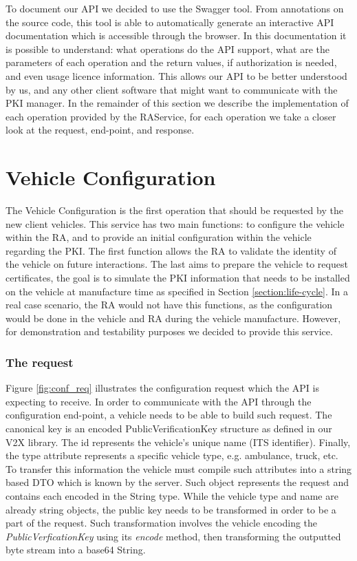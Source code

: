 To document our API we decided to use the Swagger tool. From annotations on the source code, this tool is able to automatically generate an interactive API documentation which is accessible through the browser. In this documentation it is possible to understand: what operations do the API support, what are the parameters of each operation and the return values, if authorization is needed, and even usage licence information. This allows our API to be better understood by us, and any other client software that might want to communicate with the PKI manager. In the remainder of this section we describe the implementation of each operation provided by the RAService, for each operation we take a closer look at the request, end-point, and response.

\section{Vehicle Configuration}
The Vehicle Configuration is the first operation that should be requested by the new client vehicles. This service has two main functions: to configure the vehicle within the RA, and to provide an initial configuration within the vehicle regarding the PKI. The first function allows the RA to validate the identity of the vehicle on future interactions. The last aims to prepare the vehicle to request certificates, the goal is to simulate the PKI information that needs to be installed on the vehicle at manufacture time as specified in Section \ref{section:life-cycle}. In a real case scenario, the RA would not have this functions, as the configuration would be done in the vehicle and RA during the vehicle manufacture. However, for demonstration and testability purposes we decided to provide this service. 

\subsubsection{The request}
Figure \ref{fig:conf_req} illustrates the configuration request which the API is expecting to receive. In order to communicate with the API through the configuration end-point, a vehicle needs to be able to build such request. The canonical key is an encoded PublicVerificationKey structure as defined in our V2X library. The id represents the vehicle's unique name (ITS identifier). Finally, the type attribute represents a specific vehicle type, e.g. ambulance, truck, etc. To transfer this information the vehicle must compile such attributes into a string based DTO which is known by the server. Such object represents the request and contains each encoded in the String type. While the vehicle type and name are already string objects, the public key needs to be transformed in order to be a part of the request. Such transformation involves the vehicle encoding the \textit{PublicVerficationKey} using its \textit{encode} method, then transforming the outputted byte stream into a base64 String. 

